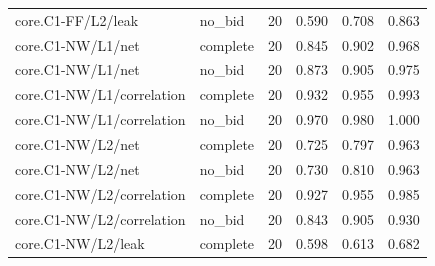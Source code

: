 \begin{longtable}{@{}p{2.2in}lrrrr@{}}
core.\allowbreak C1-FF/\allowbreak L2/\allowbreak leak & no\_\allowbreak bid & 20 & 0.590 & 0.708 & 0.863\\
core.\allowbreak C1-NW/\allowbreak L1/\allowbreak net & complete & 20 & 0.845 & 0.902 & 0.968\\
core.\allowbreak C1-NW/\allowbreak L1/\allowbreak net & no\_\allowbreak bid & 20 & 0.873 & 0.905 & 0.975\\
core.\allowbreak C1-NW/\allowbreak L1/\allowbreak correlation & complete & 20 & 0.932 & 0.955 & 0.993\\
core.\allowbreak C1-NW/\allowbreak L1/\allowbreak correlation & no\_\allowbreak bid & 20 & 0.970 & 0.980 & 1.000\\
core.\allowbreak C1-NW/\allowbreak L2/\allowbreak net & complete & 20 & 0.725 & 0.797 & 0.963\\
core.\allowbreak C1-NW/\allowbreak L2/\allowbreak net & no\_\allowbreak bid & 20 & 0.730 & 0.810 & 0.963\\
core.\allowbreak C1-NW/\allowbreak L2/\allowbreak correlation & complete & 20 & 0.927 & 0.955 & 0.985\\
core.\allowbreak C1-NW/\allowbreak L2/\allowbreak correlation & no\_\allowbreak bid & 20 & 0.843 & 0.905 & 0.930\\
core.\allowbreak C1-NW/\allowbreak L2/\allowbreak leak & complete & 20 & 0.598 & 0.613 & 0.682\\

\end{longtable}
